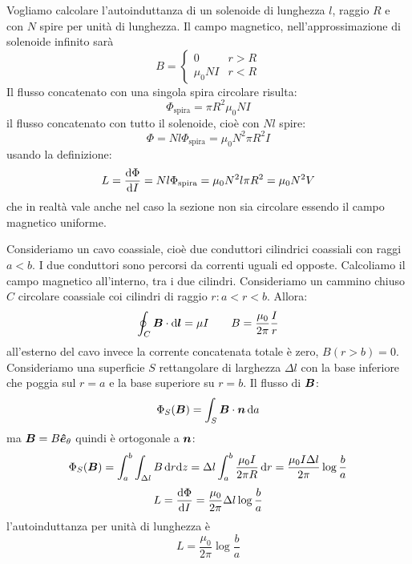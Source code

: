 \begin{Es}
  Vogliamo calcolare l'autoinduttanza di un solenoide di lunghezza $l$, raggio $R$ e con $N$ spire per unità di lunghezza. Il campo magnetico, nell'approssimazione di solenoide infinito sarà
  \begin{equation}
    B=
    \left\{
    \begin{array}{ll}
      0       & r>R \\
      \mu_0NI & r<R
    \end{array}
    \right.
  \end{equation}
  Il flusso concatenato con una singola spira circolare risulta:
  \begin{equation}
    \Phi_\text{spira}=\pi R^2\mu_0NI
  \end{equation}
  il flusso concatenato con tutto il solenoide, cioè con $Nl$ spire:
  \begin{equation}
    \Phi=Nl\Phi_\text{spira}=\mu_0N^2\pi R^2 I
  \end{equation}
  usando la definizione:
  \begin{equation}
    L=\frac{\mathrm{d}\Phi}{\mathrm{d} I}=Nl\Phi_\text{spira}=\mu_0N^2l\pi R^2=\mu_0 N^2 V
  \end{equation}
  che in realtà vale anche nel caso la sezione non sia circolare essendo il campo magnetico uniforme.
\end{Es}
\begin{Es}
  Consideriamo un cavo coassiale, cioè due conduttori cilindrici coassiali con raggi $a<b$. I due conduttori sono percorsi da correnti uguali ed opposte. Calcoliamo il campo magnetico all'interno, tra i due cilindri. Consideriamo un cammino chiuso $C$ circolare coassiale coi cilindri di raggio $r:a<r<b$. Allora:
  \begin{equation}
    \oint_C\boldsymbol{B}\cdot\mathrm{d}\boldsymbol{l}=\mu I\qquad B=\frac{\mu_0}{2\pi}\frac{I}{r}
  \end{equation}
  all'esterno del cavo invece la corrente concatenata totale è zero, $B(r>b)=0$. Consideriamo una superficie $S$ rettangolare di larghezza $\Delta l$ con la base inferiore che poggia sul $r=a$ e la base superiore su $r=b$. Il flusso di $\boldsymbol{B}$:
  \begin{equation}
    \Phi_S(\boldsymbol{B})=\int_S \boldsymbol{B}\cdot\boldsymbol{n}\,\mathrm{d} a
  \end{equation}
  ma $\boldsymbol{B}=B\boldsymbol{\hat {e}}_\theta$ quindi è ortogonale a $\boldsymbol{n}$:
  \begin{equation}
    \Phi_S(\boldsymbol{B})=\int_{a}^{b}\int_{\Delta l} B\,\mathrm{d} r\mathrm{d} z=\Delta l\int_a^b\frac{\mu_0I}{2\pi R}\,\mathrm{d} r=\frac{\mu_0I\Delta l}{2\pi}\log\frac{b}{a}
  \end{equation}
  \begin{equation}
    L=\frac{\mathrm{d}\Phi}{\mathrm{d} I}=\frac{\mu_0}{2\pi}\Delta l\log\frac{b}{a}
  \end{equation}
  l'autoinduttanza per unità di lunghezza è
  \begin{equation}
    L=\frac{\mu_0}{2\pi}\log\frac{b}{a}
  \end{equation}
\end{Es}
